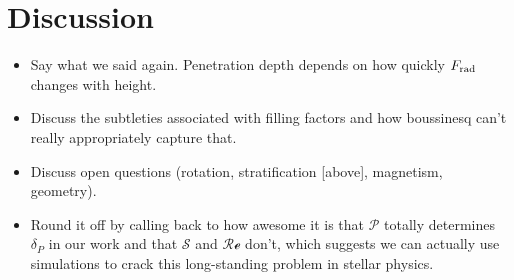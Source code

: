 \documentclass[12pt]{article}
\begin{document}
\section{Discussion}
\begin{itemize}
\item Say what we said again.
Penetration depth depends on how quickly $F_{\rm{rad}}$ changes with height.
\item Discuss the subtleties associated with filling factors and how boussinesq can't really appropriately capture that.
\item Discuss open questions (rotation, stratification [above], magnetism, geometry).
\item Round it off by calling back to how awesome it is that $\mathcal{P}$ totally determines $\delta_P$ in our work and that $\mathcal{S}$ and $\mathcal{Re}$ don't, which suggests we can actually use simulations to crack this long-standing problem in stellar physics.
\end{itemize}


\end{document}
